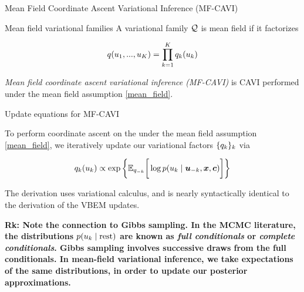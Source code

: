 \documentclass[10pt]{beamer}
\begin{document}
\begin{frame}{Mean Field Coordinate Ascent Variational Inference (MF-CAVI)}

\begin{block}{Mean field variational families}
A variational family $\mathcal{Q}$ is mean field if it factorizes 

\begin{equation} \label{mean_field}
q(u_1, ..., u_K) = \displaystyle\prod_{k=1}^K q_k(u_k)
\end{equation}
\end{block}

\textit{Mean field coordinate ascent variational inference (MF-CAVI)} is CAVI performed under the mean field assumption \eqref{mean_field}. 
   
\end{frame}

\begin{frame}{Update equations for MF-CAVI}

To perform coordinate ascent on the \VLBO under the mean field assumption \eqref{mean_field}, we iteratively update our variational factors $\{ {q_k} \}_k$ via 
 
\begin{equation} \label{mfcavi_update}
q_k(u_k) \propto \exp \bigg\{ \mathbb{E}_{q_{-k}} \bigg[  \log p(u_k \; | \; {\boldsymbol u}_{-k}, {\boldsymbol x}, {\boldsymbol c})\bigg] \bigg\}
\end{equation}

The derivation uses variational calculus, and is nearly syntactically identical to the derivation of the VBEM updates. 




\vfill \vfill \vfill \vfill \vfill \vfill
\pause \tiny \bf{Rk:} Note the connection to Gibbs sampling.  In the MCMC literature, the distributions $ p(u_k \; | \; \text{rest} )$ are known as \textit{full conditionals} or \textit{complete conditionals}.  Gibbs sampling involves successive draws from the full conditionals.  In mean-field variational inference, we take expectations of the same distributions, in order to update our posterior approximations.  
\end{frame}
\end{document}
